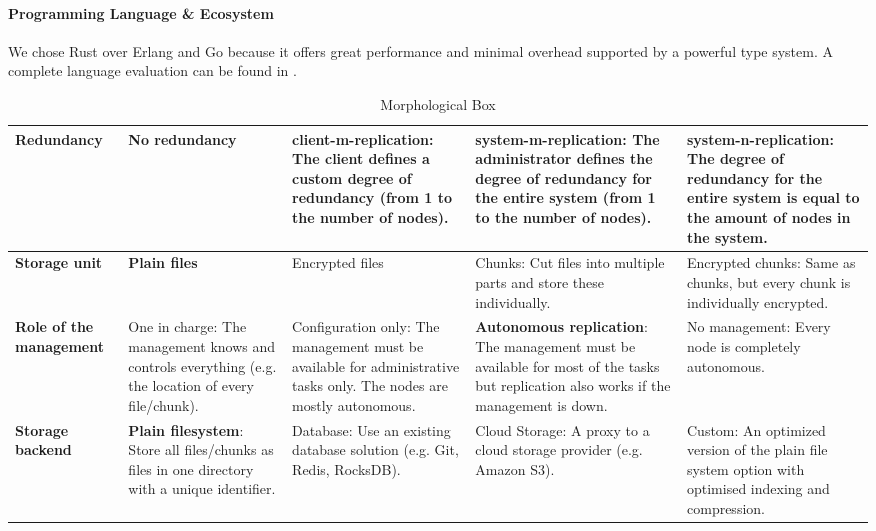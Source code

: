 \paragraph{Programming Language \& Ecosystem}
We chose Rust over Erlang and Go because it offers great performance and minimal overhead supported by a powerful type system.
A complete language evaluation can be found in .

\begin{table}
	\centering
	\caption[Morphological Box]{Morphological Box}
	\label{tbl:morphological-box}
    \begin{tabu}{X | X X X X}
		\hline
          \textbf{Redundancy}
          & No redundancy
          & \Gls{client-m-replication}: The \gls{client} defines a custom degree of redundancy (from 1 to the number of \glspl{node}).
          & \Gls{system-m-replication}: The administrator defines the degree of redundancy for the entire system (from 1 to the number of \glspl{node}).
          & \textbf{\Gls{system-n-replication}}: The degree of redundancy for the entire system is equal to the amount of \glspl{node} in the system.
          \\ \hline

          \textbf{Storage unit}
          & \textbf{Plain files}
          & Encrypted files
          & Chunks: Cut files into multiple parts and store these individually.
          & Encrypted chunks: Same as chunks, but every chunk is individually encrypted.
          \\ \hline


          \textbf{Role of the management}
          & One in charge: The management knows and controls everything (e.g. the location of every file/chunk).
          & Configuration only: The management must be available for administrative tasks only. The \glspl{node} are mostly autonomous.
          & \textbf{Autonomous replication}: The management must be available for most of the tasks but replication also works if the management is down.
          & No management: Every \gls{node} is completely autonomous.
          \\ \hline


          \textbf{Storage backend}
          & \textbf{Plain filesystem}: Store all files/chunks as files in one directory with a unique identifier.
          & Database: Use an existing database solution (e.g. Git, Redis, RocksDB).
          & Cloud Storage: A proxy to a cloud storage provider (e.g. Amazon S3).
          & Custom: An optimized version of the plain file system option with optimised indexing and compression.
          \\ \hline



\end{tabu}
\end{table}
